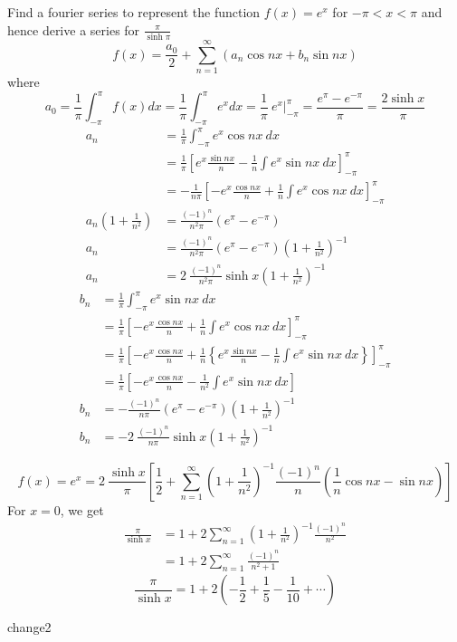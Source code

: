 \documentclass[12pt]{article}
\begin{document}
\begin{example}{
    Find a fourier series to represent the function $f(x) = e^{x}$ for $-\pi<x<\pi$ and hence derive a series for $\displaystyle \frac{\pi}{\sinh{\pi}}$
}{}
    \[
        f(x) = \frac{a_0}{2} + \sum_{n=1}^{\infty} \left( a_n \cos{nx} + b_n \sin{nx} \right)
    \] where
    \[
        a_0 = \frac{1}{\pi} \int_{-\pi}^{\pi} f(x) dx = \frac{1}{\pi} \int_{-\pi}^{\pi} e^x dx = \frac{1}{\pi} \: e^x \Bigg|_{-\pi}^{\pi} = \frac{e^{\pi} - e^{-\pi}}{\pi} = \frac{2 \sinh{x}}{\pi}
    \]
    \begin{align*}
        a_n &= \frac{1}{\pi} \int_{-\pi}^{\pi} {e^{x} \cos{nx}} \: d{x} \\
        &= \frac{1}{\pi} \left[ e^{x}\frac{\sin{nx}}{n} - \frac{1}{n}\int{e^{x}\sin{nx}} \: d{x} \right]_{-\pi}^{\pi} \\
        &= -\frac{1}{n\pi} \left[ -e^{x}\frac{\cos{nx}}{n} + \frac{1}{n} \int{e^{x}\cos{nx}} \: d{x} \right]_{-\pi}^{\pi} \\
        a_n \left( 1+\frac{1}{n^2} \right) &= \frac{(-1)^n}{n^2\pi} \left( e^{\pi} - e^{-\pi} \right) \\
        a_n &= \frac{(-1)^n}{n^2\pi} \left( e^{\pi} - e^{-\pi} \right) \left( 1+\frac{1}{n^2} \right)^{-1} \\
        a_n &= 2 \: \frac{(-1)^n}{n^2\pi} \sinh{x} \left( 1+\frac{1}{n^2} \right)^{-1}
    \end{align*}
    \begin{align*}
        b_n &= \frac{1}{\pi} \int_{-\pi}^{\pi} {e^{x}\sin{nx}} \: d{x} \\
        &= \frac{1}{\pi} \left[ -e^{x}\frac{\cos{nx}}{n} + \frac{1}{n}\int{e^{x}\cos{nx}} \: d{x} \right]_{-\pi}^{\pi} \\
        &= \frac{1}{\pi} \left[ -e^{x}\frac{\cos{nx}}{n} + \frac{1}{n} \left\{ e^{x}\frac{\sin{nx}}{n} - \frac{1}{n} \int{e^{x}\sin{nx}} \: d{x} \right\} \right]_{-\pi}^{\pi} \\
        &= \frac{1}{\pi} \left[ -e^{x}\frac{\cos{nx}}{n} - \frac{1}{n^2} \int{e^{x}\sin{nx}} \: d{x} \right] \\
        b_n &= - \frac{(-1)^n}{n\pi} \left( e^{\pi} - e^{-\pi} \right) \left( 1+\frac{1}{n^2} \right)^{-1} \\
        b_n &= -2 \: \frac{(-1)^n}{n\pi} \sinh{x} \left( 1+\frac{1}{n^2} \right)^{-1}
    \end{align*}

    \[
        \boxed{ f(x) = e^{x} = 2 \: \frac{\sinh{x}}{\pi} \left[ \frac{1}{2} + \sum_{n=1}^{\infty} \left( 1 + \frac{1}{n^2} \right)^{-1} \frac{(-1)^n}{n} \left( \frac{1}{n}\cos{nx} - \sin{nx} \right) \right] }
    \]
    For $x=0$, we get
    \begin{align*}
        \frac{\pi}{\sinh{x}} &= 1 + 2 \sum_{n=1}^{\infty} \left( 1 + \frac{1}{n^2} \right)^{-1} \frac{(-1)^n}{n^2} \\
        &= 1 + 2 \sum_{n=1}^{\infty} \frac{(-1)^n}{n^2 + 1}
    \end{align*}
    \[
        \boxed{ \frac{\pi}{\sinh{x}} = 1 + 2 \left( -\frac{1}{2} + \frac{1}{5} - \frac{1}{10} + \cdots \right) }
    \]
\end{example}



change2
\end{document}
